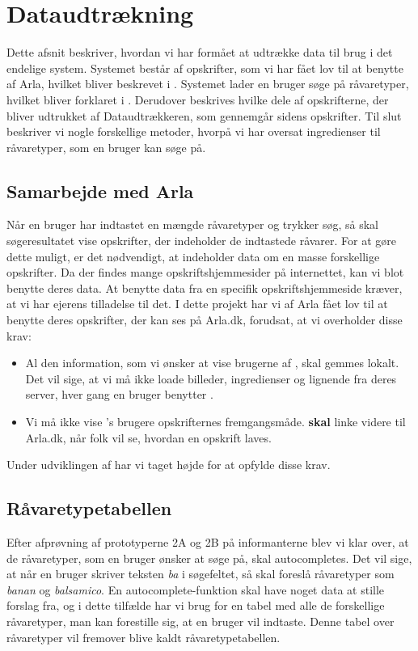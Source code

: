 \section{Dataudtrækning}
Dette afsnit beskriver, hvordan vi har formået at udtrække data til brug i det endelige system. Systemet består af opskrifter, som vi har fået lov til at benytte af Arla, hvilket bliver beskrevet i . Systemet lader en bruger søge på råvaretyper, hvilket bliver forklaret i . Derudover beskrives hvilke dele af opskrifterne, der bliver udtrukket af Dataudtrækkeren, som gennemgår sidens opskrifter. Til slut beskriver vi nogle forskellige metoder, hvorpå vi har oversat ingredienser til råvaretyper, som en bruger kan søge på.

\subsection{Samarbejde med Arla}
\label{sec:samarla}
Når en bruger har indtastet en mængde råvaretyper og trykker søg, så skal søgeresultatet vise opskrifter, der indeholder de indtastede råvarer. For at gøre dette muligt, er det nødvendigt, at \Foodl{} indeholder data om en masse forskellige opskrifter. Da der findes mange opskriftshjemmesider på internettet, kan vi blot benytte deres data. At benytte data fra en specifik opskriftshjemmeside kræver, at vi har ejerens tilladelse til det. I dette projekt har vi af Arla fået lov til at benytte deres opskrifter, der kan ses på Arla.dk, forudsat, at vi overholder disse krav:

\begin{itemize} [noitemsep]
  \item Al den information, som vi ønsker at vise brugerne af \Foodl, skal gemmes lokalt. Det vil sige, at vi må ikke loade billeder, ingredienser og lignende fra deres server, hver gang en bruger benytter \Foodl.
  \item Vi må ikke vise \Foodl{}'s brugere opskrifternes fremgangsmåde. \Foodl{} \textbf{skal} linke videre til Arla.dk, når folk vil se, hvordan en opskrift laves.
\end{itemize}
Under udviklingen af \Foodl{} har vi taget højde for at opfylde disse krav.

\subsection{Råvaretypetabellen}
\label{sec:raavare}
Efter afprøvning af prototyperne 2A og 2B på informanterne blev vi klar over, at de råvaretyper, som en bruger ønsker at søge på, skal autocompletes. Det vil sige, at når en bruger skriver teksten \textit{ba} i søgefeltet, så skal \Foodl{} foreslå råvaretyper som \fx \textit{banan} og \textit{balsamico}.
En autocomplete-funktion skal have noget data at stille forslag fra, og i dette tilfælde har vi brug for en tabel med alle de forskellige råvaretyper, man kan forestille sig, at en bruger vil indtaste. Denne tabel over råvaretyper vil fremover blive kaldt råvaretypetabellen.

